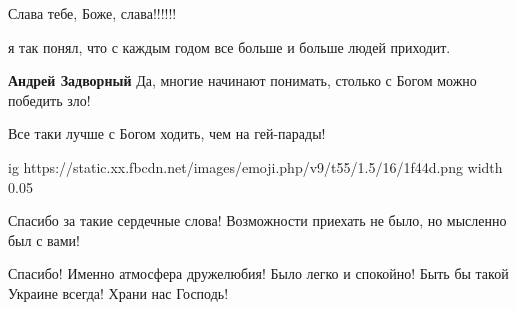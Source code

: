 \begin{itemize}
Слава тебе, Боже, слава!!!!!!

 
я так понял, что с каждым годом все больше и больше людей приходит.

\begin{itemize}
 
\textbf{Андрей Задворный} Да, многие начинают понимать, столько с Богом можно победить зло!

 
Все таки лучше с Богом ходить, чем на гей-парады!

\ifcmt
  ig https://static.xx.fbcdn.net/images/emoji.php/v9/t55/1.5/16/1f44d.png
  width 0.05
\fi

\end{itemize}

 
Спасибо за такие сердечные слова!
Возможности приехать не было, но мысленно был с вами!

 
Спасибо! Именно атмосфера дружелюбия! Было легко и спокойно! Быть бы такой
Украине всегда! Храни нас Господь!

 

\end{itemize}
